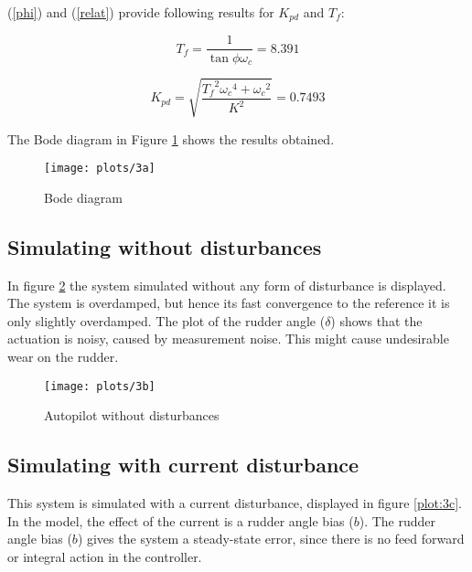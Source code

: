(\ref{phi}) and (\ref{relat}) provide following results for $K_{pd}$ and $T_{f}$:

\begin{equation*}
    {T_f} = \frac{1}{{\tan \phi {\omega _c}}} = 8.391
\end{equation*}

\begin{equation*}
    {K_{pd}} = \sqrt {\frac{{{T_f}^2{\omega _c}^4 + {\omega _c}^2}}{{{K^2}}}}  = 0.7493
\end{equation*}

The Bode diagram in Figure \ref{plot:3a} shows the results obtained.

\begin{figure}[!htb]
    \caption{Bode diagram}
    \centering
    \centerline{\texttt{[image: plots/3a]}} %
\label{plot:3a}
\end{figure}

\newpage
\subsection{Simulating without disturbances}

In figure \ref{plot:3b} the system simulated without any form of disturbance is displayed. The system is overdamped, but hence its fast convergence to the reference it is only slightly overdamped. The plot of the rudder angle ($\delta$) shows that the actuation is noisy, caused by measurement noise. This might cause undesirable wear on the rudder. 

\begin{figure}[!htb]
    \caption{Autopilot without disturbances}
    \centering
    \centerline{\texttt{[image: plots/3b]}} %
    \label{plot:3b}
\end{figure}

\newpage
\subsection{Simulating with current disturbance}

This system is simulated with a current disturbance, displayed in figure \ref{plot:3c}. In the model, the effect of the current is a rudder angle bias ($b$). The rudder angle bias ($b$) gives the system a steady-state error, since there is no feed forward or integral action in the controller.

